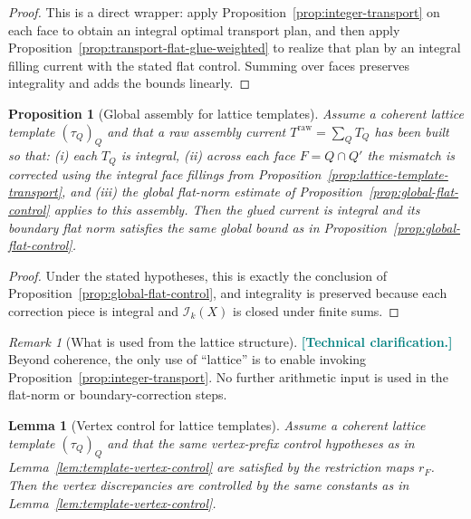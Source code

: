 \documentclass[11pt]{article}
\newcommand{\REVMZ}[1]{\textcolor{teal}{#1}}  %
\numberwithin{equation}{section}  %
\theoremstyle{plain}
\newtheorem{lemma}[theorem]{Lemma}
\newtheorem{proposition}[theorem]{Proposition}
\theoremstyle{definition}
\theoremstyle{remark}
\newtheorem{remark}[theorem]{Remark}
\begin{document}
\begin{proof}
This is a direct wrapper: apply Proposition~\ref{prop:integer-transport} on each face to obtain an integral optimal transport plan, and then
apply Proposition~\ref{prop:transport-flat-glue-weighted} to realize that plan by an integral filling current with the stated flat control.
Summing over faces preserves integrality and adds the bounds linearly.
\end{proof}

%
\begin{proposition}[Global assembly for lattice templates]\label{prop:lattice-template-global}
Assume a coherent lattice template $(\tau_Q)_Q$ and that a raw assembly current $T^{\mathrm{raw}}=\sum_Q T_Q$ has been built so that:
(i) each $T_Q$ is integral, (ii) across each face $F=Q\cap Q'$ the mismatch is corrected using the integral face fillings from
Proposition~\ref{prop:lattice-template-transport}, and (iii) the global flat-norm estimate of Proposition~\ref{prop:global-flat-control} applies
to this assembly.  Then the glued current is integral and its boundary flat norm satisfies the same global bound as in
Proposition~\ref{prop:global-flat-control}.
\end{proposition}

\begin{proof}
Under the stated hypotheses, this is exactly the conclusion of Proposition~\ref{prop:global-flat-control}, and integrality is preserved because
each correction piece is integral and $\mathcal I_k(X)$ is closed under finite sums.
\end{proof}

%
\begin{remark}[What is used from the lattice structure]\label{rem:lattice-flat-remark}
\REVMZ{\textbf{[Technical clarification.]}}
Beyond coherence, the only use of ``lattice'' is to enable invoking Proposition~\ref{prop:integer-transport}.  No further arithmetic input is used
in the flat-norm or boundary-correction steps.
\end{remark}


%
\begin{lemma}[Vertex control for lattice templates]\label{lem:lattice-vertex-control}
Assume a coherent lattice template $(\tau_Q)_Q$ and that the same vertex-prefix control hypotheses as in Lemma~\ref{lem:template-vertex-control}
are satisfied by the restriction maps $r_F$.  Then the vertex discrepancies are controlled by the same constants as in
Lemma~\ref{lem:template-vertex-control}.
\end{lemma}
\end{document}
